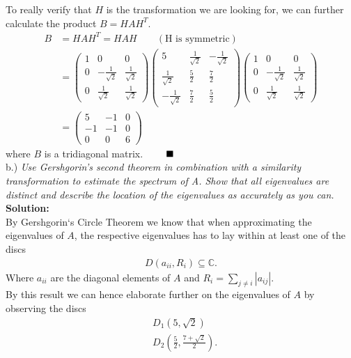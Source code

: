 \documentclass[12pt,
               a4paper,
               article,
               oneside,
               english,oldfontcommands]{memoir}
\newcommand{\Q}{ \qquad \hfill \blacksquare}
\newcommand{\spaze}{\vspace{4mm}\\}
\begin{document}
To really verify that $H$ is the transformation we are looking for, we can further calculate the product $B = H A H^T$. 
\begin{align*}
B &= H A H^T = H A H  \qquad (\text{H is symmetric})\\[10pt]
&=\begin{pmatrix}
1 & 0 & 0 \\[5pt]
0 & -\frac{1}{\sqrt{2}} & \frac{1}{\sqrt{2}} \\[5pt]
0 & \frac{1}{\sqrt{2}} & \frac{1}{\sqrt{2}}
\end{pmatrix} 
\begin{pmatrix}
5 & \frac{1}{\sqrt{2}} &  -\frac{1}{\sqrt{2}} \\[5pt]
\frac{1}{\sqrt{2}} &\frac{5}{2} & \frac{7}{2} \\[5pt]
-\frac{1}{\sqrt{2}} & \frac{7}{2} & \frac{5}{2}
\end{pmatrix}
\begin{pmatrix}
1 & 0 & 0 \\[5pt]
0 & -\frac{1}{\sqrt{2}} & \frac{1}{\sqrt{2}} \\[5pt]
0 & \frac{1}{\sqrt{2}} & \frac{1}{\sqrt{2}}
\end{pmatrix}
\\[10pt]
&= 
\begin{pmatrix}
5 & -1 & 0 \\[5pt]
-1 & -1 & 0\\[5pt]
0 & 0 & 6
\end{pmatrix}
\end{align*}
where $B$ is a tridiagonal matrix. $\Q$ \spaze 
b.) \emph{Use Gershgorin’s second theorem in combination with a similarity transformation to estimate the spectrum of A. Show that all eigenvalues are distinct and describe the location of the eigenvalues as accurately as you can.} \spaze 
\textbf{Solution:} \spaze
By Gershgorin`s Circle Theorem we know that when approximating the eigenvalues of $A$, the respective eigenvalues has to lay within at least one of the discs 
\begin{align*}
D(a_{ii}, R_i) \subseteq \mathbb{C}.
\end{align*}
Where $a_{ii}$ are the diagonal elements of $A$ and $R_i = \sum_{j \neq i} |a_{ij}|$.\vspace{2mm}\\ By this result we can hence elaborate further on the eigenvalues of $A$ by observing the discs
\begin{align}
&D_{1}(5, \sqrt{2}) \\[5pt]
&D_{2} \left( \frac{5}{2}, \frac{7 + \sqrt{2}}{2} \right).
\end{align}
\end{document}

